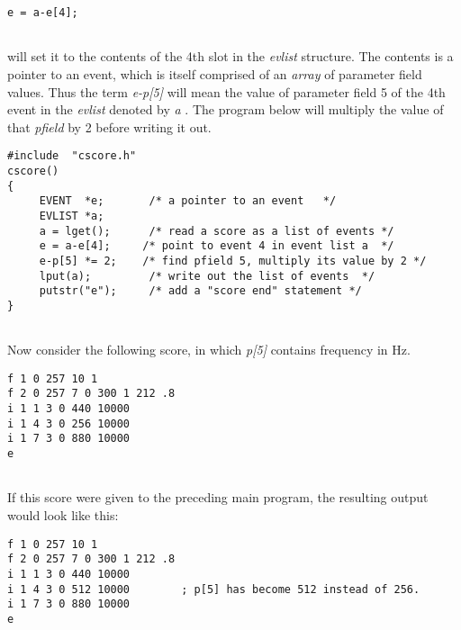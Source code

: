  
\begin{lstlisting}
e = a-e[4];
      
\end{lstlisting}


 
 will set it to the contents of the 4th slot in the \emph{evlist}
 structure. The contents is a pointer to an event, which is itself comprised of an \emph{array }
of parameter field values. Thus the term \emph{e-p[5]}
 will mean the value of parameter field 5 of the 4th event in the\emph{ evlist}
 denoted by \emph{a}
. The program below will multiply the value of that \emph{pfield }
by 2 before writing it out. 

 
\begin{lstlisting}
#include  "cscore.h" 
cscore() 
{ 
     EVENT  *e;       /* a pointer to an event   */ 
     EVLIST *a; 
     a = lget();      /* read a score as a list of events */ 
     e = a-e[4];     /* point to event 4 in event list a  */ 
     e-p[5] *= 2;    /* find pfield 5, multiply its value by 2 */ 
     lput(a);         /* write out the list of events  */ 
     putstr("e");     /* add a "score end" statement */ 
}
      
\end{lstlisting}


 


  Now consider the following score, in which \emph{p[5]}
 contains frequency in Hz. 


 
\begin{lstlisting}
f 1 0 257 10 1 
f 2 0 257 7 0 300 1 212 .8 
i 1 1 3 0 440 10000 
i 1 4 3 0 256 10000 
i 1 7 3 0 880 10000 
e
      
\end{lstlisting}


 


  If this score were given to the preceding main program, the resulting output would look like this: 


 
\begin{lstlisting}
f 1 0 257 10 1 
f 2 0 257 7 0 300 1 212 .8 
i 1 1 3 0 440 10000 
i 1 4 3 0 512 10000        ; p[5] has become 512 instead of 256. 
i 1 7 3 0 880 10000 
e
      
\end{lstlisting}


 



